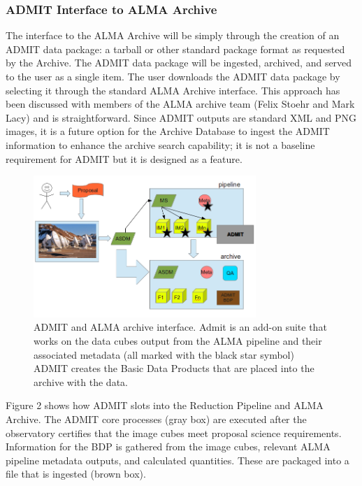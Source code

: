 \subsubsection{ADMIT Interface to ALMA Archive}

The interface to the ALMA Archive will be simply through the creation of an 
ADMIT data package: a tarball or other standard package format as requested by 
the Archive. The ADMIT data package will be ingested, archived, and served 
to the user as a single item. The user downloads the ADMIT data package by 
selecting it through the standard ALMA Archive interface. This approach has been 
discussed with members of the ALMA archive team (Felix Stoehr and Mark Lacy) and 
is straightforward. Since ADMIT outputs are standard XML and PNG images, 
it is a future option for the Archive Database to ingest the ADMIT information 
to enhance the archive search capability; it is not a baseline requirement for 
ADMIT but it is designed as a feature.

\begin{figure}[t]
\centering
\includegraphics[width=0.75\textwidth]{admit-flow1a.png}
\hspace{0.03in}
\caption{\small \setlength{\baselineskip}{0.85\baselineskip}
ADMIT and ALMA archive interface. Admit is an add-on suite that works
on the data cubes output from the ALMA pipeline and their associated
metadata (all marked with the black star symbol) ADMIT creates the
Basic Data Products that are placed into the archive with the data.
  }
\label{fig:Flow1}
\end{figure}

Figure 2 shows how ADMIT slots into the Reduction Pipeline and ALMA Archive. 
The ADMIT core processes (gray box) are executed after the observatory certifies 
that the image cubes meet proposal science requirements. Information for the BDP 
is gathered from the image cubes, relevant ALMA pipeline metadata outputs, and 
calculated quantities. These are packaged into a file that is ingested (brown box). 

